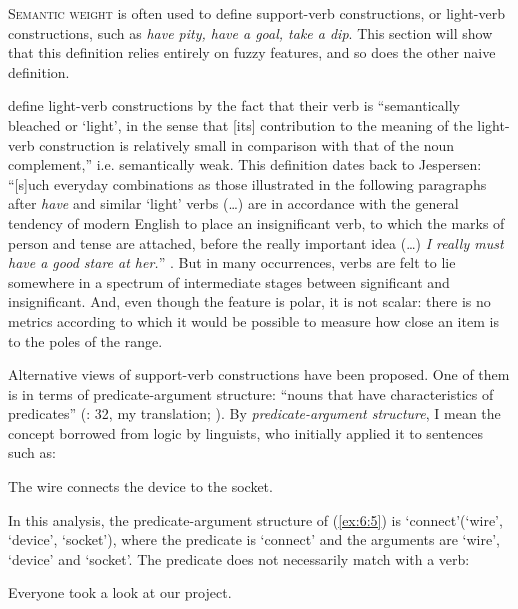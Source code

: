 \documentclass[output=paper]{langsci/langscibook}
\begin{document}
\textsc{Semantic weight} is often used to define support-verb constructions, or light-verb constructions, such as \textit{have pity, have a goal, take a dip}. This section will show that this definition relies entirely on fuzzy features, and so does the other naive definition. 

\citet[276]{Baldwin2010} define light-verb constructions by the fact that their verb is “semantically bleached or ‘light’, in the sense that [its] contribution to the meaning of the light-verb construction is relatively small in comparison with that of the noun complement,” i.e. semantically weak. This definition dates back to Jespersen: “[s]uch everyday combinations as those illustrated in the following paragraphs after \textit{have} and similar ‘light’ verbs (\ldots) are in accordance with the general tendency of modern English to place an insignificant verb, to which the marks of person and tense are attached, before the really important idea (\ldots) \textit{I really must have a good stare at her.}” \citep[117]{Jespersen1942}. But in many occurrences, verbs are felt to lie somewhere in a spectrum of intermediate stages between significant and insignificant. And, even though the feature is polar, it is not scalar: there is no metrics according to which it would be possible to measure how close an item is to the poles of the range.

Alternative views of support-verb constructions have been proposed. One of them is in terms of predicate-argument structure: “nouns that have characteristics of predicates” (\citealt{Gross1981}: 32, my translation; \citealt{Cattell1984}). By \textit{predicate-argument structure}, I mean the concept borrowed from logic by linguists, who initially applied it \citep{Tesniere1959} to sentences such as:

\begin{exe}
 \ex   \label{ex:6:5}
The wire connects the device to the socket.
\end{exe}
	
\noindent In this analysis, the predicate-argument structure of (\ref{ex:6:5}) is ‘connect’(‘wire’, ‘device’, ‘socket’), where the predicate is ‘connect’ and the arguments are ‘wire’, ‘device’ and ‘socket’. The predicate does not necessarily match with a verb:


\begin{exe}
 \ex   \label{ex:6:6}
Everyone took a look at our project.
\end{exe}
\end{document}
